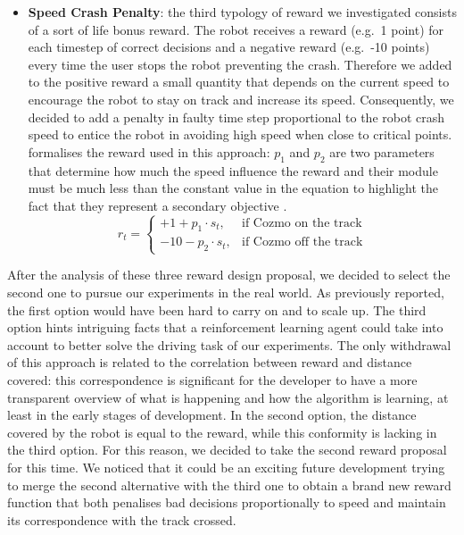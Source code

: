 \begin{itemize}
    \item \textbf{Speed Crash Penalty}: the third typology of reward we investigated consists of a sort of life bonus reward.
          The robot receives a reward (e.g.\ 1 point) for each timestep of correct decisions and a negative reward (e.g.\ -10 points) every time the user stops the robot preventing the crash.
          Therefore we added to the positive reward a small quantity that depends on the current speed to encourage the robot to stay on track and increase its speed.
          Consequently, we decided to add a penalty in faulty time step proportional to the robot crash speed to entice the robot in avoiding high speed when close to critical points.
           formalises the reward used in this approach: $p_1$ and $p_2$ are two parameters that determine how much the speed influence the reward and their module must be much less than the constant value in the equation to highlight the fact that they represent a secondary objective \cite{raffin2019learning}.
          \begin{equation}
              r_t = \begin{cases}
                  +1 + p_1 \cdot s_t, & \mbox{if } \mbox{Cozmo on the track} \\ -10 - p_2 \cdot s_t, & \mbox{if } \mbox{Cozmo off the track}
              \end{cases}
              \label{eq:speedCrashPenalty}
          \end{equation}

\end{itemize}

After the analysis of these three reward design proposal, we decided to select the second one to pursue our experiments in the real world.
As previously reported, the first option would have been hard to carry on and to scale up.
The third option hints intriguing facts that a reinforcement learning agent could take into account to better solve the driving task of our experiments.
The only withdrawal of this approach is related to the correlation between reward and distance covered: this correspondence is significant for the developer to have a more transparent overview of what is happening and how the algorithm is learning, at least in the early stages of development.
In the second option, the distance covered by the robot is equal to the reward, while this conformity is lacking in the third option.
For this reason, we decided to take the second reward proposal for this time.
We noticed that it could be an exciting future development trying to merge the second alternative with the third one to obtain a brand new reward function that both penalises bad decisions proportionally to speed and maintain its correspondence with the track crossed.

